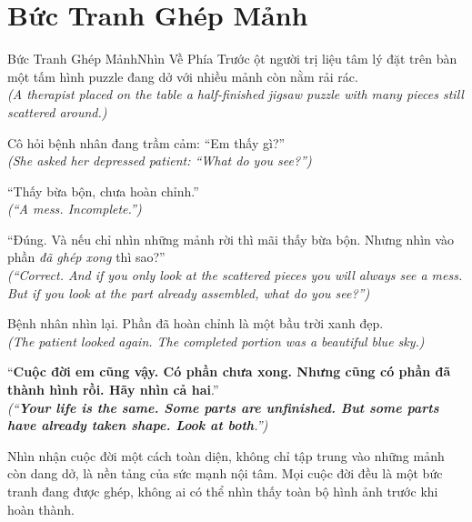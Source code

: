 \section{Bức Tranh Ghép Mảnh}
\begin{truyen}{Bức Tranh Ghép Mảnh}{Nhìn Về Phía Trước}
ột người trị liệu tâm lý đặt trên bàn một tấm hình puzzle đang dở với nhiều mảnh còn nằm rải rác.\\
\textit{(A therapist placed on the table a half-finished jigsaw puzzle with many pieces still scattered around.)}

Cô hỏi bệnh nhân đang trầm cảm: ``Em thấy gì?''\\
\textit{(She asked her depressed patient: ``What do you see?'')}

``Thấy bừa bộn, chưa hoàn chỉnh.''\\
\textit{(``A mess. Incomplete.'')}

``Đúng. Và nếu chỉ nhìn những mảnh rời thì mãi thấy bừa bộn. Nhưng nhìn vào phần \textit{đã ghép xong} thì sao?''\\
\textit{(``Correct. And if you only look at the scattered pieces you will always see a mess. But if you look at the part \textit{already assembled}, what do you see?'')}

Bệnh nhân nhìn lại. Phần đã hoàn chỉnh là một bầu trời xanh đẹp.\\
\textit{(The patient looked again. The completed portion was a beautiful blue sky.)}

``\textbf{Cuộc đời em cũng vậy. Có phần chưa xong. Nhưng cũng có phần đã thành hình rồi. Hãy nhìn cả hai}.''\\
\textit{(``\textbf{Your life is the same. Some parts are unfinished. But some parts have already taken shape. Look at both}.'')}
\end{truyen}
\begin{baihoc}
  Nhìn nhận cuộc đời một cách toàn diện, không chỉ tập trung vào những mảnh còn dang dở, là nền tảng của sức mạnh nội tâm. Mọi cuộc đời đều là một bức tranh đang được ghép, không ai có thể nhìn thấy toàn bộ hình ảnh trước khi hoàn thành.
\end{baihoc}

